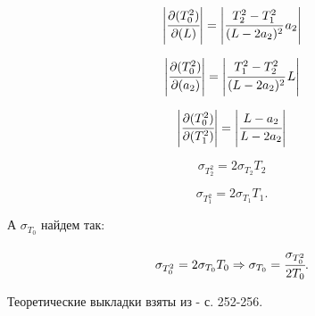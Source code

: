 \documentclass[a4paper,12pt]{article}
\begin{document}
\begin{center}
	\vspace{-20pt}
	\begin{equation}
	\left| \cfrac{\partial(T_0^2)}{\partial(L)} \right| = \left|\cfrac{T_2^2-T_1^2}{(L-2a_2)^2}\, a_2\right|
	\end{equation}
	\vspace{-20pt}
\end{center}
\begin{center}
	\vspace{-20pt}
	\begin{equation}
	\left| \cfrac{\partial(T_0^2)}{\partial(a_2)} \right| = \left|\cfrac{T_1^2-T_2^2}{(L-2a_2)^2}\, L\right|
	\end{equation}
	\vspace{-20pt}
\end{center}
\begin{center}
	\vspace{-20pt}
	\begin{equation}
	\left| \cfrac{\partial(T_0^2)}{\partial(T_1^2)} \right| = \left|\cfrac{L-a_2}{L-2a_2}\right|
	\label{13}
	\end{equation}
	\vspace{-20pt}
\end{center}
\begin{center}
	\vspace{-20pt}
	\begin{equation}
	\sigma_{T_2^2}=2 \sigma_{T_2} T_2
	\end{equation}
	\vspace{-20pt}
\end{center}
\begin{center}
	\vspace{-20pt}
	\begin{equation}
	\sigma_{T_1^2}=2\sigma_{T_1} T_1.
	\label{15}
	\end{equation}
	\vspace{-20pt}
\end{center}
А $\sigma_{T_0}$ найдем так:
\begin{center}
	\vspace{-20pt}
	\begin{equation}
	\sigma_{T_0^2}=2\sigma_{T_0} T_0 \Rightarrow \sigma_{T_0}=\cfrac{\sigma_{T_0^2}}{2T_0}.
	\end{equation}
	\vspace{-20pt}
\end{center}
Теоретические выкладки взяты из \cite{Gladun:PrakMech} - с. 252-256.
\end{document}
